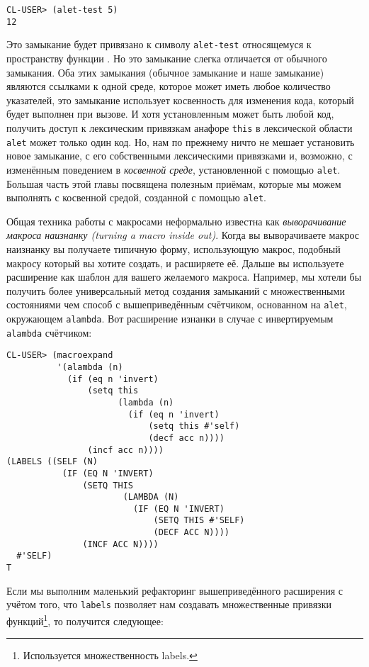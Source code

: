\begin{verbatim}
CL-USER> (alet-test 5)
12
\end{verbatim}

Это замыкание будет привязано к символу \verb"alet-test" относящемуся к пространству функции . Но это замыкание слегка отличается от обычного замыкания. Оба этих замыкания (обычное замыкание и наше замыкание) являются ссылками к одной среде, которое может иметь любое количество указателей, это замыкание использует косвенность для изменения кода, который будет выполнен при вызове. И хотя установленным может быть любой код, получить доступ к лексическим привязкам анафоре \verb"this" в лексической области \verb"alet" может только один код. Но, нам по прежнему ничто не мешает установить новое замыкание, с его собственными лексическими привязками и, возможно, с изменённым поведением в \emph{косвенной среде}, установленной с помощью \verb"alet". Большая часть этой главы посвящена полезным приёмам, которые мы можем выполнять с косвенной средой, созданной с помощью \verb"alet".

Общая техника работы с макросами неформально известна как \emph{выворачивание макроса наизнанку (turning a macro inside out)}. Когда вы выворачиваете макрос наизнанку вы получаете типичную форму, использующую макрос, подобный макросу который вы хотите создать, и расширяете её. Дальше вы используете расширение как шаблон для вашего желаемого макроса. Например, мы хотели бы получить более универсальный метод создания замыканий с множественными состояниями чем способ с вышеприведённым счётчиком, основанном на \verb"alet", окружающем \verb"alambda". Вот расширение изнанки в случае с инвертируемым \verb"alambda" счётчиком:

\begin{verbatim}
CL-USER> (macroexpand
          '(alambda (n)
            (if (eq n 'invert)
                (setq this
                      (lambda (n)
                        (if (eq n 'invert)
                            (setq this #'self)
                            (decf acc n))))
                (incf acc n))))
(LABELS ((SELF (N)
           (IF (EQ N 'INVERT)
               (SETQ THIS
                       (LAMBDA (N)
                         (IF (EQ N 'INVERT)
                             (SETQ THIS #'SELF)
                             (DECF ACC N))))
               (INCF ACC N))))
  #'SELF)
T
\end{verbatim}

Если мы выполним маленький рефакторинг вышеприведённого расширения с учётом того, что \verb"labels" позволяет нам создавать множественные привязки функций\footnote{Используется множественность labels.}, то получится следующее:



